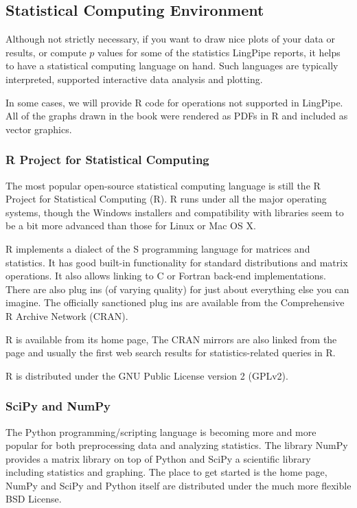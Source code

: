 \subsection{Statistical Computing Environment}\label{section:intro-R}

Although not strictly necessary, if you want to draw nice plots of
your data or results, or compute $p$ values for some of the statistics
LingPipe reports, it helps to have a statistical computing language on
hand.  Such languages are typically interpreted, supported interactive
data analysis and plotting.  

In some cases, we will provide R code for operations not supported in
LingPipe.  All of the graphs drawn in the book were rendered as PDFs
in R and included as vector graphics.

\subsubsection{R Project for Statistical Computing}

The most popular open-source statistical computing language is still
the R Project for Statistical Computing (R).  R runs under all the
major operating systems, though the Windows installers and
compatibility with libraries seem to be a bit more advanced than those
for Linux or Mac OS X.

R implements a dialect of the S programming language for matrices and
statistics.  It has good built-in functionality for standard
distributions and matrix operations.  It also allows linking to C or
Fortran back-end implementations.  There are also plug ins (of varying
quality) for just about everything else you can imagine.  The
officially sanctioned plug ins are available from the Comprehensive R
Archive Network (CRAN).

R is available from its home page,
%
%
The CRAN mirrors are also linked from the page and usually the first
web search results for statistics-related queries in R.

R is distributed under the GNU Public License version 2 (GPLv2).  



\subsubsection{SciPy and NumPy}

The Python programming/scripting language is becoming more and more
popular for both preprocessing data and analyzing statistics.  The
library NumPy provides a matrix library on top of Python and SciPy
a scientific library including statistics and graphing.  The place
to get started is the home page,
%
%
NumPy and SciPy and Python itself are distributed under the much more
flexible BSD License.  

